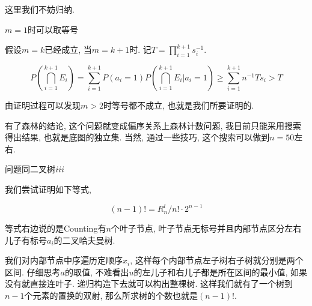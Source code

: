 \begin{prob} [概率链]
		这里我们不妨归纳.
		
		$m = 1$时可以取等号
		
		假设$m = k$已经成立, 当$m = k + 1$时. 记$T = \prod\limits_{i = 1}^{k+1}s_i^{-1}$. 
		
		\begin{equation*}
			P(\bigcap\limits_{i=1}^{k+1}E_i) 
			= \sum\limits_{i=1}^{k+1}P(a_i=1)P(\bigcap\limits_{i=1}^{k+1}E_i|a_i=1)
			\geq \sum\limits_{i=1}^{k+1}n^{-1}Ts_i
			> T
		\end{equation*}
		
		由证明过程可以发现$m>2$时等号都不成立, 也就是我们所要证明的.
		
		有了森林的结论, 这个问题就变成偏序关系上森林计数问题, 我目前只能采用搜索得出结果, 也就是底图的独立集. 当然, 通过一些技巧, 这个搜索可以做到$n=50$左右.

	\end{prob}
	
	\begin{prob} [二叉树$\uppercase\expandafter{\romannumeral3}$另解]
	
		问题同二叉树$\uppercase\expandafter{\romannumeral3}$
		
		\sol
		我们尝试证明如下等式, 
		
		\begin{equation*}
			(n - 1)! = R_n^l / n! \cdot 2^{n - 1}
		\end{equation*}
		
		等式右边说的是Counting有$n$个叶子节点, 叶子节点无标号并且内部节点区分左右儿子有标号$a_i$的二叉哈夫曼树.
		
		我们对内部节点中序遍历定顺序$x_i$, 这样每个内部节点左子树右子树就分别是两个区间. 仔细思考$a$的取值, 不难看出$u$的左儿子和右儿子都是所在区间的最小值, 如果没有就直接连叶子. 递归构造下去就可以构出整棵树. 这样我们就有了一个树到$n - 1$个元素的置换的双射, 那么所求树的个数也就是$(n - 1)!$.
	
	\end{prob}

